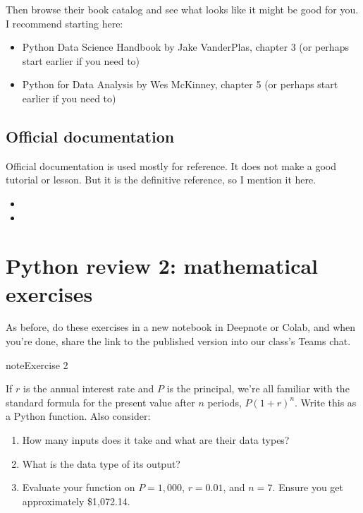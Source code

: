 \documentclass[letterpaper,10pt,english]{sphinxmanual}
\begin{document}
Then browse their book catalog and see what looks like it might be good for you.  I recommend starting here:
\begin{itemize}
\item {} 
Python Data Science Handbook by Jake VanderPlas, chapter 3 (or perhaps start earlier if you need to)

\item {} 
Python for Data Analysis by Wes McKinney, chapter 5 (or perhaps start earlier if you need to)

\end{itemize}


\subsection{Official documentation}
\label{\detokenize{chapter-4-review-of-python-and-pandas:official-documentation}}
Official documentation is used mostly for reference.  It does not make a good tutorial or lesson.  But it is the definitive reference, so I mention it here.
\begin{itemize}
\item {} 

\item {} 

\end{itemize}


\section{Python review 2: mathematical exercises}
\label{\detokenize{chapter-4-review-of-python-and-pandas:python-review-2-mathematical-exercises}}
As before, do these exercises in a new notebook in Deepnote or Colab, and when you’re done, share the link to the published version into our class’s Teams chat.

\begin{sphinxadmonition}{note}{Exercise 2}

If \(r\) is the annual interest rate and \(P\) is the principal, we’re all familiar with the standard formula for the present value after \(n\) periods, \(P(1+r)^n\).  Write this as a Python function.  Also consider:
\begin{enumerate}
%
\item {} 
How many inputs does it take and what are their data types?

\item {} 
What is the data type of its output?

\item {} 
Evaluate your function on \(P=1,000\), \(r=0.01\), and \(n=7\).  Ensure you get approximately \$1,072.14.

\end{enumerate}
\end{sphinxadmonition}
\end{document}
